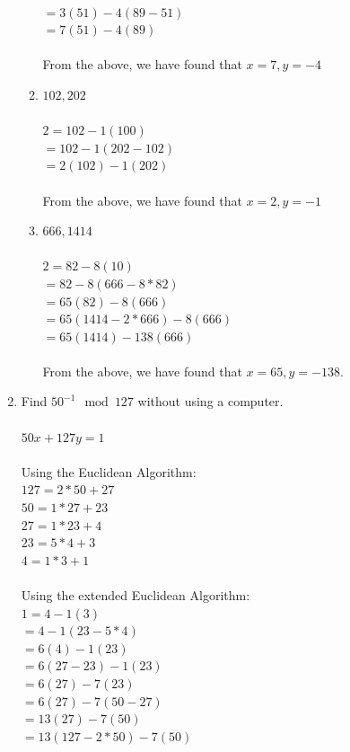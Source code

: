 \documentclass[]{article}
\begin{document}
\begin{enumerate}
\begin{enumerate}
        \\$=3(51)-4(89-51)$
        \\$=7(51)-4(89)$
        \\\\From the above, we have found that $x=7,y=-4$
        \item $102,202$
        \\\\ $2=102-1(100)$
        \\$=102-1(202-102)$
        \\$=2(102)-1(202)$
        \\\\From the above, we have found that $x=2,y=-1$
        \item $666,1414$
        \\\\$2=82-8(10)$
        \\$=82-8(666-8*82)$
        \\$=65(82)-8(666)$
        \\$=65(1414-2*666)-8(666)$
        \\$=65(1414)-138(666)$
        \\\\From the above, we have found that $x=65,y=-138$.
    \end{enumerate}
    \item Find $50^{-1} \mod 127$ without using a computer.
    \\\\$50x + 127y = 1$
    \\\\Using the Euclidean Algorithm:
    \\$127=2*50+27$
    \\$50=1*27+23$
    \\$27=1*23+4$
    \\$23=5*4+3$
    \\$4=1*3+1$
    \\\\Using the extended Euclidean Algorithm:
    \\$1=4-1(3)$
    \\$=4-1(23-5*4)$
    \\$=6(4)-1(23)$
    \\$=6(27-23)-1(23)$
    \\$=6(27)-7(23)$
    \\$=6(27)-7(50-27)$
    \\$=13(27)-7(50)$
    \\$=13(127-2*50)-7(50)$

\end{enumerate}
\end{document}
